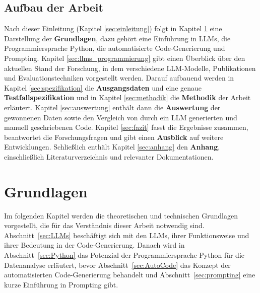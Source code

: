 \documentclass[11pt,a4paper]{article}
\begin{document}
\subsection{Aufbau der Arbeit}
Nach dieser Einleitung (Kapitel \ref{sec:einleitung}) folgt in Kapitel \ref{sec:grundlagen} eine Darstellung der \textbf{Grundlagen}, dazu gehört eine Einführung in LLMs, die Programmiersprache Python, die automatisierte Code-Generierung und Prompting. Kapitel \ref{sec:llms_programmierung} gibt einen Überblick über den aktuellen Stand der Forschung, in dem verschiedene LLM-Modelle, Publikationen und Evaluationstechniken vorgestellt werden. Darauf aufbauend werden in Kapitel \ref{sec:spezifikation} die \textbf{Ausgangsdaten} und eine genaue \textbf{Testfallspezifikation} und in Kapitel \ref{sec:methodik} die \textbf{Methodik} der Arbeit erläutert. Kapitel \ref{sec:auswertung} enthält dann die \textbf{Auswertung} der gewonnenen Daten sowie den Vergleich von durch ein LLM generierten und manuell geschriebenen Code. Kapitel \ref{sec:fazit} fasst die Ergebnisse zusammen, beantwortet die Forschungsfragen und gibt einen \textbf{Ausblick} auf weitere Entwicklungen. Schließlich enthält Kapitel \ref{sec:anhang} den \textbf{Anhang}, einschließlich Literaturverzeichnis und relevanter Dokumentationen.


\section{Grundlagen}
\label{sec:grundlagen}
Im folgenden Kapitel werden die theoretischen und technischen Grundlagen vorgestellt, die für das Verständnis dieser Arbeit notwendig sind. Abschnitt~\ref{sec:LLMs} beschäftigt sich mit den LLMs, ihrer Funktionsweise und ihrer Bedeutung in der Code-Generierung. Danach wird in Abschnitt~\ref{sec:Python} das Potenzial der Programmiersprache Python für die Datenanalyse erläutert, bevor Abschnitt~\ref{sec:AutoCode} das Konzept der automatisierten Code-Generierung behandelt und Abschnitt~\ref{sec:prompting} eine kurze Einführung in Prompting gibt.
\end{document}
